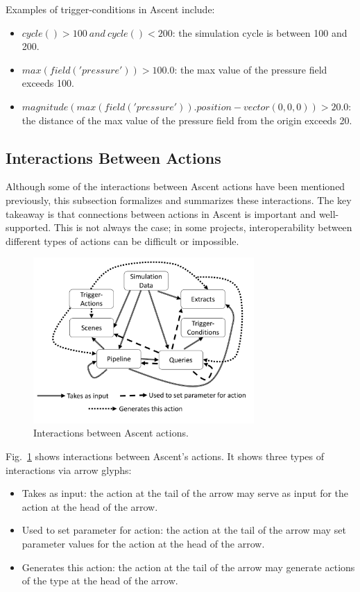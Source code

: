 Examples of trigger-conditions in Ascent include:
\begin{itemize}
\item $cycle() > 100 \ and \ cycle() < 200$: the simulation cycle is
between 100 and 200.
\item $max(field('pressure')) > 100.0$: the max value of the pressure field
exceeds 100.
\item $magnitude(max(field('pressure')).position - vector(0,0,0)) > 20.0$: the distance of the max
value of the pressure field from the origin exceeds 20.
\end{itemize}

\subsection{Interactions Between Actions}

Although some of the interactions between Ascent actions have been mentioned previously,
this subsection formalizes and summarizes these interactions.
%
The key takeaway is that connections between actions in Ascent is important and well-supported.
%
This is not always the case; in some projects, interoperability between different types of actions
can be difficult or impossible.

\begin{figure}
\centering
\includegraphics[width=0.75\textwidth]{images/ascent_interactions}
\caption{\label{fig:interactions} Interactions between Ascent actions.}
\end{figure}

Fig.~\ref{fig:interactions} shows interactions between Ascent's actions.
%
It shows three types of interactions via arrow glyphs:
%
\begin{itemize}
\item Takes as input: the action at the tail of the arrow may serve as input for the action at the head of the arrow.
\item Used to set parameter for action: the action at the tail of the arrow may set parameter values for the action at the head of the arrow.
\item Generates this action: the action at the tail of the arrow may generate actions of the type at the head of the arrow.
\end{itemize}

